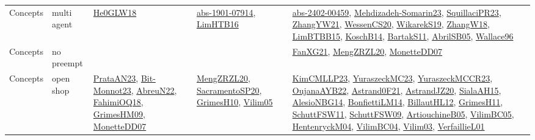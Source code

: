 {\begin{longtable}{llp{6cm}p{6cm}p{6cm}}
Concepts & multi agent & \href{papers/He0GLW18.pdf}{He0GLW18}\cite{He0GLW18} & \href{articles/abs-1901-07914.pdf}{abs-1901-07914}\cite{abs-1901-07914}, \href{papers/LimHTB16.pdf}{LimHTB16}\cite{LimHTB16} & \href{articles/abs-2402-00459.pdf}{abs-2402-00459}\cite{abs-2402-00459}, \href{papers/Mehdizadeh-Somarin23.pdf}{Mehdizadeh-Somarin23}\cite{Mehdizadeh-Somarin23}, \href{papers/SquillaciPR23.pdf}{SquillaciPR23}\cite{SquillaciPR23}, \href{articles/ZhangYW21.pdf}{ZhangYW21}\cite{ZhangYW21}, \href{papers/WessenCS20.pdf}{WessenCS20}\cite{WessenCS20}, \href{articles/WikarekS19.pdf}{WikarekS19}\cite{WikarekS19}, \href{articles/ZhangW18.pdf}{ZhangW18}\cite{ZhangW18}, \href{papers/LimBTBB15.pdf}{LimBTBB15}\cite{LimBTBB15}, \href{papers/KoschB14.pdf}{KoschB14}\cite{KoschB14}, \href{articles/BartakS11.pdf}{BartakS11}\cite{BartakS11}, \href{papers/AbrilSB05.pdf}{AbrilSB05}\cite{AbrilSB05}, \href{articles/Wallace96.pdf}{Wallace96}\cite{Wallace96}\\
Concepts & no preempt &  &  & \href{articles/FanXG21.pdf}{FanXG21}\cite{FanXG21}, \href{articles/MengZRZL20.pdf}{MengZRZL20}\cite{MengZRZL20}, \href{papers/MonetteDD07.pdf}{MonetteDD07}\cite{MonetteDD07}\\
Concepts & open shop & \href{articles/PrataAN23.pdf}{PrataAN23}\cite{PrataAN23}, \href{papers/Bit-Monnot23.pdf}{Bit-Monnot23}\cite{Bit-Monnot23}, \href{articles/AbreuN22.pdf}{AbreuN22}\cite{AbreuN22}, \href{articles/FahimiOQ18.pdf}{FahimiOQ18}\cite{FahimiOQ18}, \href{papers/GrimesHM09.pdf}{GrimesHM09}\cite{GrimesHM09}, \href{papers/MonetteDD07.pdf}{MonetteDD07}\cite{MonetteDD07} & \href{articles/MengZRZL20.pdf}{MengZRZL20}\cite{MengZRZL20}, \href{articles/SacramentoSP20.pdf}{SacramentoSP20}\cite{SacramentoSP20}, \href{papers/GrimesH10.pdf}{GrimesH10}\cite{GrimesH10}, \href{papers/Vilim05.pdf}{Vilim05}\cite{Vilim05} & \href{papers/KimCMLLP23.pdf}{KimCMLLP23}\cite{KimCMLLP23}, \href{papers/YuraszeckMC23.pdf}{YuraszeckMC23}\cite{YuraszeckMC23}, \href{articles/YuraszeckMCCR23.pdf}{YuraszeckMCCR23}\cite{YuraszeckMCCR23}, \href{papers/OujanaAYB22.pdf}{OujanaAYB22}\cite{OujanaAYB22}, \href{papers/Astrand0F21.pdf}{Astrand0F21}\cite{Astrand0F21}, \href{articles/AstrandJZ20.pdf}{AstrandJZ20}\cite{AstrandJZ20}, \href{papers/SialaAH15.pdf}{SialaAH15}\cite{SialaAH15}, \href{papers/AlesioNBG14.pdf}{AlesioNBG14}\cite{AlesioNBG14}, \href{papers/BonfiettiLM14.pdf}{BonfiettiLM14}\cite{BonfiettiLM14}, \href{papers/BillautHL12.pdf}{BillautHL12}\cite{BillautHL12}, \href{papers/GrimesH11.pdf}{GrimesH11}\cite{GrimesH11}, \href{articles/SchuttFSW11.pdf}{SchuttFSW11}\cite{SchuttFSW11}, \href{papers/SchuttFSW09.pdf}{SchuttFSW09}\cite{SchuttFSW09}, \href{papers/ArtiouchineB05.pdf}{ArtiouchineB05}\cite{ArtiouchineB05}, \href{articles/VilimBC05.pdf}{VilimBC05}\cite{VilimBC05}, \href{papers/HentenryckM04.pdf}{HentenryckM04}\cite{HentenryckM04}, \href{papers/VilimBC04.pdf}{VilimBC04}\cite{VilimBC04}, \href{papers/Vilim03.pdf}{Vilim03}\cite{Vilim03}, \href{papers/VerfaillieL01.pdf}{VerfaillieL01}\cite{VerfaillieL01}\\

\end{longtable}}
